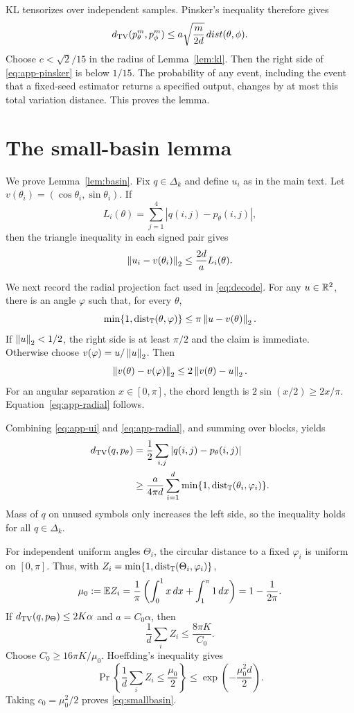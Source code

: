KL tensorizes over independent samples.
Pinsker's inequality therefore gives
\begin{equation}
 d_{\mathrm{TV}}(p_\theta^m,p_\phi^m)
 \le a\sqrt{\frac{m}{2d}}\,dist(\theta,\phi).
 \label{eq:app-pinsker}
\end{equation}
Choose $c<\sqrt2/15$ in the radius of Lemma~\ref{lem:kl}.
Then the right side of \eqref{eq:app-pinsker} is below $1/15$.
The probability of any event, including the event that a fixed-seed estimator returns a specified output, changes by at most this total variation distance.
This proves the lemma.

\section{The small-basin lemma}
\label{app:basin}

We prove Lemma~\ref{lem:basin}.
Fix $q\in\Delta_k$ and define $u_i$ as in the main text.
Let $v(\theta_i)=(\cos\theta_i,\sin\theta_i)$.
If
\[
 L_i(\theta)=\sum_{j=1}^4|q(i,j)-p_\theta(i,j)|,
\]
then the triangle inequality in each signed pair gives
\begin{equation}
 \left\lVert u_i-v(\theta_i)\right\rVert_2
 \le\frac{2d}{a}L_i(\theta).
 \label{eq:app-ui}
\end{equation}

We next record the radial projection fact used in \eqref{eq:decode}.
For any $u\in\mathbb R^2$, there is an angle $\varphi$ such that, for every $\theta$,
\begin{equation}
 \min\{1,\operatorname{dist}_\mathbb T(\theta,\varphi)\}
 \le\pi\left\lVert u-v(\theta)\right\rVert_2.
 \label{eq:app-radial}
\end{equation}
If $\left\lVert u\right\rVert_2<1/2$, the right side is at least $\pi/2$ and the claim is immediate.
Otherwise choose $v(\varphi)=u/\left\lVert u\right\rVert_2$.
Then
\[
 \left\lVert v(\theta)-v(\varphi)\right\rVert_2
 \le2\left\lVert v(\theta)-u\right\rVert_2.
\]
For an angular separation $x\in[0,\pi]$, the chord length is $2\sin(x/2)\ge2x/\pi$.
Equation~\eqref{eq:app-radial} follows.

Combining \eqref{eq:app-ui} and \eqref{eq:app-radial}, and summing over blocks, yields
\begin{align*}
 d_{\mathrm{TV}}(q,p_\theta)
 &=\frac12\sum_{i,j}|q(i,j)-p_\theta(i,j)|\\
 &\ge\frac{a}{4\pi d}\sum_{i=1}^d
 \min\{1,\operatorname{dist}_\mathbb T(\theta_i,\varphi_i)\}.
\end{align*}
Mass of $q$ on unused symbols only increases the left side, so the inequality holds for all $q\in\Delta_k$.

For independent uniform angles $\Theta_i$, the circular distance to a fixed $\varphi_i$ is uniform on $[0,\pi]$.
Thus, with $Z_i=\min\{1,\operatorname{dist}_\mathbb T(\Theta_i,\varphi_i)\}$,
\[
 \mu_0:=\mathbb E Z_i
 =\frac1\pi\left(\int_0^1x\,dx+\int_1^\pi1\,dx\right)
 =1-\frac1{2\pi}.
\]
If $d_{\mathrm{TV}}(q,p_\Theta)\le2K\alpha$ and $a=C_0\alpha$, then
\[
 \frac1d\sum_iZ_i\le\frac{8\pi K}{C_0}.
\]
Choose $C_0\ge16\pi K/\mu_0$.
Hoeffding's inequality gives
\[
 \Pr\left\{\frac1d\sum_iZ_i\le\frac{\mu_0}{2}\right\}
 \le\exp\left(-\frac{\mu_0^2d}{2}\right).
\]
Taking $c_0=\mu_0^2/2$ proves \eqref{eq:smallbasin}.

